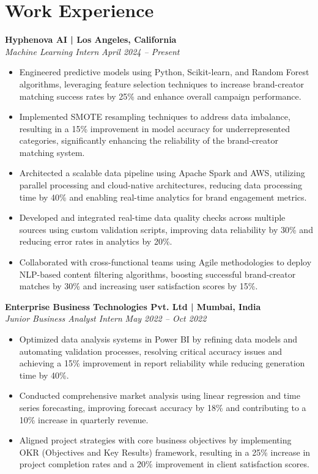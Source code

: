 \documentclass[a4paper,10pt]{article}
\begin{document}
\section*{Work Experience}
\noindent\textbf{Hyphenova AI | Los Angeles, California} \\
\textit{Machine Learning Intern} \hfill \textit{April 2024 – Present}
\begin{itemize}[leftmargin=*]
    \item Engineered predictive models using Python, Scikit-learn, and Random Forest algorithms, leveraging feature selection techniques to increase brand-creator matching success rates by 25\% and enhance overall campaign performance.
    \item Implemented SMOTE resampling techniques to address data imbalance, resulting in a 15\% improvement in model accuracy for underrepresented categories, significantly enhancing the reliability of the brand-creator matching system.
    \item Architected a scalable data pipeline using Apache Spark and AWS, utilizing parallel processing and cloud-native architectures, reducing data processing time by 40\% and enabling real-time analytics for brand engagement metrics.
    \item Developed and integrated real-time data quality checks across multiple sources using custom validation scripts, improving data reliability by 30\% and reducing error rates in analytics by 20\%.
    \item Collaborated with cross-functional teams using Agile methodologies to deploy NLP-based content filtering algorithms, boosting successful brand-creator matches by 30\% and increasing user satisfaction scores by 15\%.
\end{itemize}

\vspace{0.1cm}

\noindent\textbf{Enterprise Business Technologies Pvt. Ltd | Mumbai, India} \\
\textit{Junior Business Analyst Intern} \hfill \textit{May 2022 – Oct 2022}
\begin{itemize}[leftmargin=*]
    \item Optimized data analysis systems in Power BI by refining data models and automating validation processes, resolving critical accuracy issues and achieving a 15\% improvement in report reliability while reducing generation time by 40\%.
    \item Conducted comprehensive market analysis using linear regression and time series forecasting, improving forecast accuracy by 18\% and contributing to a 10\% increase in quarterly revenue.
    \item Aligned project strategies with core business objectives by implementing OKR (Objectives and Key Results) framework, resulting in a 25\% increase in project completion rates and a 20\% improvement in client satisfaction scores.
\end{itemize}
\end{document}
